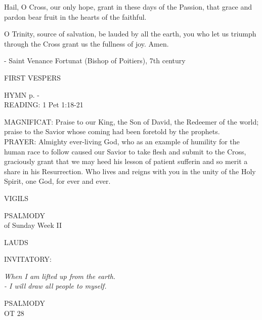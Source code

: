 Hail, O Cross, our only hope,
grant in these days of the Passion,
that grace and pardon bear fruit
in the hearts of the faithful.

O Trinity, source of salvation,
be lauded by all the earth,
you who let us triumph through the Cross
grant us the fullness of joy. Amen.

- Saint Venance Fortunat (Bishop of Poitiers), 7th century

\begin{flushleft}\normalsize{\uppercase{FIRST VESPERS\\}}\end{flushleft}
\small{\uppercase{HYMN} p. \pageref{lent:firstHymn}-\pageref{lent:lastHymn}\\}
\noindent\small{\uppercase{READING:}}    1 Pet 1:18-21 \textbf{   \\}

\noindent\small{\uppercase{MAGNIFICAT:}}	Praise to our King, the Son of David, the Redeemer of the world; praise to the Savior whose coming had been foretold by the prophets.\\

\noindent\small{\uppercase{PRAYER:}}	Almighty ever-living God, who as an example of humility for the human race to follow caused our Savior to take flesh and submit to the Cross, graciously grant that we may heed his lesson of patient sufferin and so merit a share in his Resurrection. Who lives and reigns with you in the unity of the Holy Spirit, one God, for ever and ever.

\begin{flushleft}\normalsize{\uppercase{VIGILS\\}}\end{flushleft}
\noindent\small{\uppercase{Psalmody}\\} of Sunday Week II

\begin{flushleft}\normalsize{\uppercase{LAUDS\\}}\end{flushleft}
\small{\uppercase{INVITATORY:}}\normalsize
\begin{center}
\textit{When I am lifted up from the earth.\\}
\textit{- I will draw all people to myself.\\}
\end{center}
\noindent\small{\uppercase{PSALMODY}\\}
\uppercase{OT 28}\vspace{0.5em}\\

